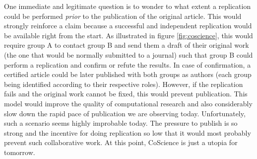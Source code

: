 \documentclass[a4paper,10pt, twocolumn]{article}
\begin{document}

One immediate and legitimate question is to wonder to what extent a
replication could be performed \textit{prior} to the publication of
the original article. This would strongly reinforce a claim because a
successful and independent replication would be available right from
the start. As illustrated in figure \ref{fig:coscience}, this would
require group A to contact group B and send them a draft of
their original work (the one that would be normally submitted to a
journal) such that group B could perform a replication and confirm or
refute the results. In case of confirmation, a certified article could
be later published with both groups as authors (each group being
identified according to their respective roles). However, if the
replication fails and the original work cannot be fixed, this would
prevent publication. This model would improve the quality of
computational research and also considerably slow down the rapid pace
of publication we are observing today. Unfortunately, such a scenario
seems highly improbable today. The pressure to publish is so strong
and the incentive for doing replication so low that it would most
probably prevent such collaborative work. At this point, CoScience is
just a utopia for tomorrow.




\renewcommand*{\bibfont}{\footnotesize}
\printbibliography[title=References]
\end{document}

